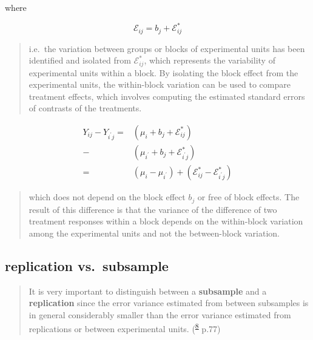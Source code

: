 \documentclass[
]{book}
\theoremstyle{definition}
\theoremstyle{definition}
\theoremstyle{definition}
\theoremstyle{definition}
\theoremstyle{remark}
\begin{document}
where

\[
\mathcal{E}_{{\scriptscriptstyle i}{\scriptscriptstyle j}}=b_{{\scriptscriptstyle j}}+\mathcal{E}_{{\scriptscriptstyle i}{\scriptscriptstyle j}}^{*}
\]

\begin{quote}
i.e.~the variation between groups or blocks of experimental units has been identified and isolated from \(\mathcal{E}_{ij}^{*}\), which represents the variability of experimental units within a block. By isolating the block effect from the experimental units, the within-block variation can be used to compare treatment effects, which involves computing the estimated standard errors of contrasts of the treatments.
\end{quote}

\[
\begin{aligned}
Y_{{\scriptscriptstyle i}{\scriptscriptstyle j}}-Y_{{\scriptscriptstyle i^{\prime}}{\scriptscriptstyle j}}= & \left(\mu_{{\scriptscriptstyle i}}+b_{{\scriptscriptstyle j}}+\mathcal{E}_{{\scriptscriptstyle i}{\scriptscriptstyle j}}^{*}\right)\\
- & \left(\mu_{{\scriptscriptstyle i^{\prime}}}+b_{{\scriptscriptstyle j}}+\mathcal{E}_{{\scriptscriptstyle i^{\prime}}{\scriptscriptstyle j}}^{*}\right)\\
= & \left(\mu_{{\scriptscriptstyle i}}-\mu_{{\scriptscriptstyle i^{\prime}}}\right)+\left(\mathcal{E}_{{\scriptscriptstyle i}{\scriptscriptstyle j}}^{*}-\mathcal{E}_{{\scriptscriptstyle i^{\prime}}{\scriptscriptstyle j}}^{*}\right)
\end{aligned}
\]

\begin{quote}
which does not depend on the block effect \(b_{j}\) or free of block effects. The result of this difference is that the variance of the difference of two treatment responses within a block depends on the within-block variation among the experimental units and not the between-block variation.
\end{quote}

\hypertarget{replication-vs.-subsample}{%
\subsection{replication vs.~subsample}\label{replication-vs.-subsample}}

\begin{quote}
It is very important to distinguish between a \textbf{subsample} and a \textbf{replication} since the error variance estimated from between subsamples is in general considerably smaller than the error variance estimated from replications or between experimental units. (\textsuperscript{\protect\hyperlink{ref-milliken2004}{8}} p.77)
\end{quote}
\end{document}
